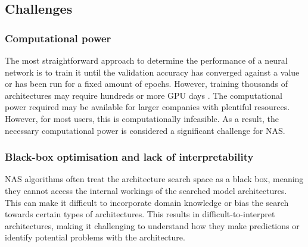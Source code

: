 \subsection{Challenges}
\subsubsection{Computational power}
The most straightforward approach to determine the performance of a neural network is to train it until the validation accuracy has converged against a value or has been run for a fixed amount of epochs. However, training thousands of architectures may require hundreds or more GPU days \autocite{ren2021comprehensive}. The computational power required may be available for larger companies with plentiful resources. However, for most users, this is computationally infeasible. As a result, the necessary computational power is considered a significant challenge for NAS. 

\subsubsection{Black-box optimisation and lack of interpretability}
NAS algorithms often treat the architecture search space as a black box, meaning they cannot access the internal workings of the searched model architectures. This can make it difficult to incorporate domain knowledge or bias the search towards certain types of architectures. This results in difficult-to-interpret architectures, making it challenging to understand how they make predictions or identify potential problems with the architecture. \autocite{https://doi.org/10.48550/arxiv.1806.09055}
